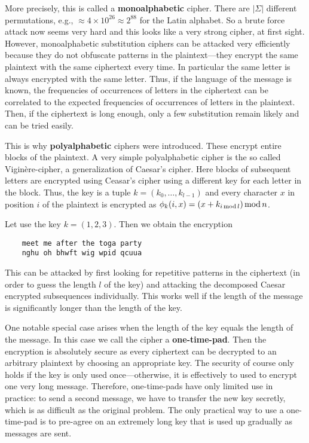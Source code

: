 More precisely, this is called a \textbf{monoalphabetic} cipher.
There are $|\Sigma|$ different permutations, e.g., $\approx 4\times 10^{26}\approx 2^{88}$ for the Latin alphabet.
So a brute force attack now seems very hard and this looks like a very strong cipher, at first sight. 
However, monoalphabetic substitution ciphers can be attacked very efficiently because they do not obfuscate patterns in the plaintext---they encrypt the same plaintext with the same ciphertext every time.
In particular the same letter is always encrypted with the same letter. 
Thus, if the language of the message is known, the frequencies of occurrences of letters in the ciphertext can be correlated to the expected frequencies of occurrences of letters in the plaintext.
Then, if the ciphertext is long enough, only a few substitution remain likely and can be tried easily.

This is why \textbf{polyalphabetic} ciphers were introduced.
These encrypt entire blocks of the plaintext.
A very simple polyalphabetic cipher is the so called Vigin\`ere-cipher, a generalization of Caesar's cipher.
Here blocks of subsequent letters are encrypted using Ceasar's cipher using a different key for each letter in the block.
Thus, the key is a tuple $k=(k_0,\ldots,k_{l-1})$ and every character $x$ in position $i$ of the plaintext is encrypted as $\phi_k(i,x)=(x+k_{i\mathop{\mathrm{mod}} l})\mathop{\mathrm{mod}} n$.

\begin{example}
 Let use the key $k=(1,2,3)$.
 Then we obtain the encryption
  \begin{lstlisting}
    meet me after the toga party
    nghu oh bhwft wig wpid qcuua
  \end{lstlisting}
\end{example}
This can be attacked by first looking for repetitive patterns in the ciphertext (in order to guess the length $l$ of the key) and attacking the decomposed Caesar encrypted subsequences individually. 
This works well if the length of the message is significantly longer than the length of the key. 

One notable special case arises when the length of the key equals the length of the message.
In this case we call the cipher a \textbf{one-time-pad}.
Then the encryption is absolutely secure as every ciphertext can be decrypted to an arbitrary plaintext by choosing an appropriate key.
The security of course only holds if the key is only used once---otherwise, it is effectively to used to encrypt one very long message.
Therefore, one-time-pads have only limited use in practice: to send a second message, we have to transfer the new key secretly, which is as difficult as the original problem.
The only practical way to use a one-time-pad is to pre-agree on an extremely long key that is used up gradually as messages are sent.

